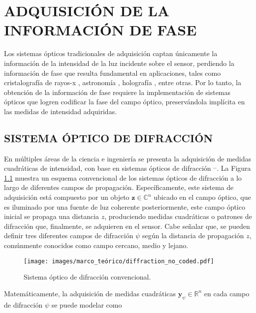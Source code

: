 \chapter{ADQUISICIÓN DE LA INFORMACIÓN DE FASE}

Los sistemas ópticos tradicionales de adquisición captan únicamente la información de la intensidad de la luz incidente sobre el sensor, perdiendo la información de fase que resulta fundamental en aplicaciones, tales como cristalografía de rayos-x , astronomía , holografía , entre otras. Por lo tanto, la obtención de la información de fase requiere la implementación  de sistemas ópticos que logren codificar la fase del campo óptico, preservándola implícita en las medidas de intensidad adquiridas. 
    
\section{SISTEMA ÓPTICO DE DIFRACCIÓN}
En múltiples áreas de la ciencia e ingeniería se presenta la adquisición de medidas cuadráticas de intensidad, con base en sistemas ópticos de difracción $^,$$^,$. La Figura \ref{fig:difraction_systems} muestra un esquema convencional de los sistemas ópticos de difracción a lo largo de diferentes campos de propagación. Específicamente, este sistema de adquisición está compuesto por un objeto $\mathbf{z}\in\mathbb{C}^{n}$ ubicado en el campo óptico, que es iluminado por una fuente de luz coherente posteriormente, este campo óptico inicial se propaga una distancia $z$, produciendo medidas cuadráticas o patrones de difracción que, finalmente, se adquieren en el sensor. Cabe señalar que, se pueden definir tres diferentes campos de difracción $\psi$ según la distancia de propagación $z$, comúnmente conocidos como campo cercano, medio y lejano.

\begin{figure}[!h]
    \centering
    \caption{\hspace{2mm}Sistema óptico de difracción convencional.}
    \texttt{[image: images/marco\_teórico/diffraction\_no\_coded.pdf]}
    \label{fig:difraction_systems}
\end{figure}

Matemáticamente, la adquisición de medidas cuadráticas $\mathbf{y}_{\psi}\in\mathbb{R}^n$ en cada campo de difracción $\psi$ se puede modelar como 

